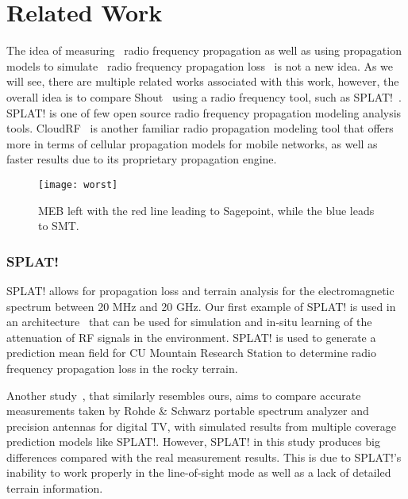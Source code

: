 

\section{Related Work}
\label{sec:related}

The idea of measuring~\cite{pathloss, modelingand} radio frequency propagation as well as using propagation models to 
simulate~\cite{educationalsimulation} radio frequency propagation loss~\cite{directionalradio} is not a new idea. As we will see, there are multiple related works 
associated with this work, however, the overall idea is to compare Shout~\cite{shout} using a radio frequency tool, such as SPLAT!~\cite{splat}. 
SPLAT! is one of few open source radio frequency propagation modeling analysis tools. CloudRF~\cite{cloudrf} is another familiar radio 
propagation modeling tool that offers more in terms of cellular propagation models for mobile networks, as well as faster results due to its 
proprietary propagation engine. 

\begin{figure}
  \centering
  \texttt{[image: worst]}
  \caption{MEB left with the red line leading to Sagepoint, while the blue leads to SMT.}
  \label{fig:worst}
\end{figure}

%
\subsubsection*{SPLAT!}
SPLAT! allows for propagation loss and terrain analysis for the electromagnetic spectrum between 20 MHz and 20 GHz. Our first 
example of SPLAT! is used in an architecture~\cite{hybridRF} that can be used for simulation and in-situ learning of the attenuation
of RF signals in the environment. SPLAT! is used to generate a prediction mean field for CU Mountain Research Station to determine
radio frequency propagation loss in the rocky terrain. 

Another study~\cite{comparisonof}, that similarly resembles ours, aims to compare accurate measurements taken by Rohde \& 
Schwarz portable spectrum analyzer and precision antennas for digital TV, with simulated results from multiple coverage prediction 
models like SPLAT!. However, SPLAT! in this study produces big differences compared with the real measurement results. This is 
due to SPLAT!'s inability to work properly in the line-of-sight mode as well as a lack of detailed terrain information. 

